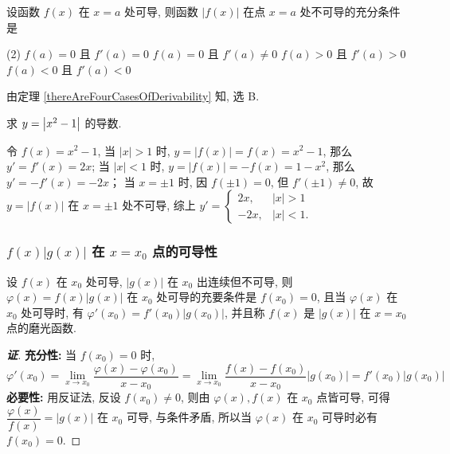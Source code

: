 \begin{example}[2000 数三]
    设函数 $f(x)$ 在 $x=a$ 处可导, 则函数 $|f(x)|$ 在点 $x=a$ 处不可导的充分条件是
    \begin{tasks}(2)
        \task $f(a)=0$ 且 $f'(a)=0$
        \task $f(a)=0$ 且 $f'(a)\not=0$
        \task $f(a)>0$ 且 $f'(a)>0$
        \task $f(a)<0$ 且 $f'(a)<0$
    \end{tasks}
\end{example}
\begin{solution}
    由定理 \ref{thereAreFourCasesOfDerivability} 知, 选 B.
\end{solution}

\begin{example}
    求 $y=\qty|x^2-1|$ 的导数.
\end{example}
\begin{solution}
    令 $f(x)=x^2-1$, 当 $ |x|>1 $ 时, $y=|f(x)|=f(x)=x^2-1$, 那么 $y'=f'(x)=2x$; 当 $|x|<1$ 时, $y=|f(x)|=-f(x)=1-x^2$, 那么 $y'=-f'(x)=-2x$；
    当 $x=\pm 1$ 时, 因 $f(\pm 1)=0$, 但 $f'(\pm 1)\neq0$, 故 $y=|f(x)|$ 在 $x=\pm1$ 处不可导, 综上 $y'=\begin{cases}
        2x,&|x|>1\\-2x,&|x|<1.
    \end{cases}$
\end{solution}

\subsubsection{\texorpdfstring{$f(x)|g(x)|$}. 在 \texorpdfstring{$x=x_0$}. 点的可导性}

\begin{theorem}
    \label{hanshukedaoxing}
    设 $f(x)$ 在 $x_0$ 处可导, $|g(x)|$ 在 $x_0$ 出连续但不可导, 则 $\varphi (x)=f(x)|g(x)|$ 在 $x_0$ 处可导的充要条件是 $f(x_0)=0$, 
    且当 $\varphi(x)$ 在 $x_0$ 处可导时, 有 $\varphi'(x_0)=f'(x_0)|g(x_0)|$, 并且称 $f(x)$ 是 $|g(x)|$ 在 $x=x_0$ 点的磨光函数.
\end{theorem}
\begin{proof}[{\songti \textbf{证}}]
    \textbf{充分性: }当 $f(x_0)=0$ 时, $$ \varphi'(x_0)=\lim_{x\to x_0}\dfrac{\varphi (x)-\varphi(x_0)}{x-x_0}=\lim_{x\to x_0}\dfrac{f(x)-f(x_0)}{x-x_0}|g(x_0)|=f'(x_0)|g(x_0)| $$
    \textbf{必要性: }用反证法, 反设 $f(x_0)\neq 0$, 则由 $\varphi(x),f(x)$ 在 $x_0$ 点皆可导, 可得 $\dfrac{\varphi(x)}{f(x)}=|g(x)|$ 在 $x_0$ 可导, 与条件矛盾, 所以当 $\varphi(x)$ 在 $x_0$ 可导时必有 $f(x_0)=0.$
\end{proof}

